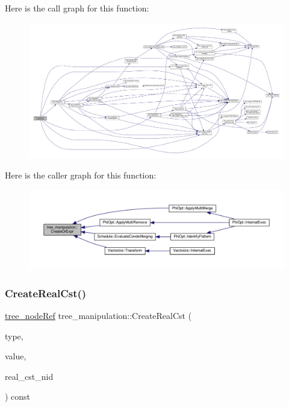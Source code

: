 Here is the call graph for this function\+:
\nopagebreak
\begin{figure}[H]
\begin{center}
\leavevmode
\includegraphics[width=350pt]{d0/d99/classtree__manipulation_a5ee94fdaf0baf5152b9e2161c9d6ce05_cgraph}
\end{center}
\end{figure}
Here is the caller graph for this function\+:
\nopagebreak
\begin{figure}[H]
\begin{center}
\leavevmode
\includegraphics[width=350pt]{d0/d99/classtree__manipulation_a5ee94fdaf0baf5152b9e2161c9d6ce05_icgraph}
\end{center}
\end{figure}
\mbox{\label{classtree__manipulation_ae075d962ddf33404b7dfcd9ff1172194}} 
\subsubsection{\texorpdfstring{Create\+Real\+Cst()}{CreateRealCst()}}
{\footnotesize\ttfamily \hyperlink{tree__node_8hpp_a6ee377554d1c4871ad66a337eaa67fd5}{tree\+\_\+node\+Ref} tree\+\_\+manipulation\+::\+Create\+Real\+Cst (\begin{DoxyParamCaption}\item[{const \hyperlink{tree__node_8hpp_a3cf5d02292c940f3892425a5b5fdec3c}{tree\+\_\+node\+Const\+Ref} \&}]{type,  }\item[{const long double}]{value,  }\item[{const unsigned int}]{real\+\_\+cst\+\_\+nid }\end{DoxyParamCaption}) const}



